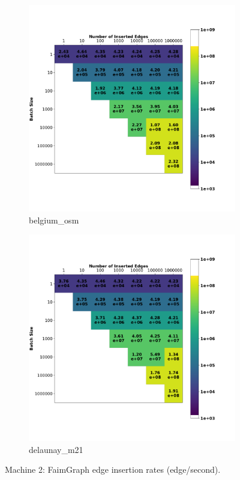 \begin{figure}
    \begin{subfigure}{0.5\textwidth}
        \centering
        \includegraphics[width=\linewidth]{Chapters/Figures/plots/faimgraph_edge_update_belgium_osm_benchmark.pdf}
        \caption{belgium\_osm}
    \end{subfigure}%
    \begin{subfigure}{0.5\textwidth}
        \centering
        \includegraphics[width=\linewidth]{Chapters/Figures/plots/faimgraph_edge_update_delaunay_n21_benchmark.pdf}
        \caption{delaunay\_m21}
    \end{subfigure}%
    \caption{Machine 2: FaimGraph edge insertion rates (edge/second).}
    \label{fig:faimgraph_insertion_heat_plot}
\end{figure}



